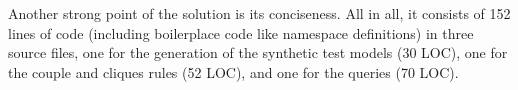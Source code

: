 \documentclass[submission]{eptcs}
\begin{document}
Another strong point of the solution is its conciseness.  All in all, it
consists of 152 lines of code (including boilerplace code like namespace
definitions) in three source files, one for the generation of the synthetic
test models (30 LOC), one for the couple and cliques rules (52 LOC), and one
for the queries (70 LOC).




\end{document}
